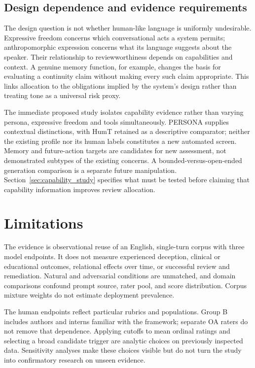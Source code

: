 \documentclass[manuscript,screen,review,anonymous]{acmart}
\begin{document}
\subsection{Design dependence and evidence requirements}
The design question is not whether human-like language is uniformly undesirable. Expressive freedom concerns which conversational acts a system permits; anthropomorphic expression concerns what its language suggests about the speaker. Their relationship to reviewworthiness depends on capabilities and context. A genuine memory function, for example, changes the basis for evaluating a continuity claim without making every such claim appropriate. This links allocation to the obligations implied by the system's design rather than treating tone as a universal risk proxy.

The immediate proposed study isolates capability evidence rather than varying persona, expressive freedom and tools simultaneously. PERSONA supplies contextual distinctions, with HumT retained as a descriptive comparator; neither the existing profile nor its human labels constitutes a new automated screen. Memory and future-action targets are candidates for new assessment, not demonstrated subtypes of the \IAPositive{} existing concerns. A bounded-versus-open-ended generation comparison is a separate future manipulation. Section~\ref{sec:capability_study} specifies what must be tested before claiming that capability information improves review allocation.

\section{Limitations}
The evidence is observational reuse of an English, single-turn corpus with three model endpoints. It does not measure experienced deception, clinical or educational outcomes, relational effects over time, or successful review and remediation. Natural and adversarial conditions are unmatched, and domain comparisons confound prompt source, rater pool, and score distribution. Corpus mixture weights do not estimate deployment prevalence.

The human endpoints reflect particular rubrics and populations. Group B includes authors and interns familiar with the framework; separate OA raters do not remove that dependence. Applying cutoffs to mean ordinal ratings and selecting a broad candidate trigger are analytic choices on previously inspected data. Sensitivity analyses make these choices visible but do not turn the study into confirmatory research on unseen evidence.
\end{document}
